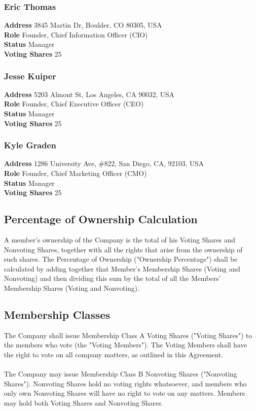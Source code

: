 \documentclass[11pt]{article}
\begin{document}
\subsubsection{Eric Thomas}
\textbf{Address} 3845 Martin Dr, Boulder, CO 80305, USA\\
\textbf{Role} Founder, Chief Information Officer (CIO)\\
\textbf{Status} Manager \\
\textbf{Voting Shares} 25

\subsubsection{Jesse Kuiper}
\textbf{Address} 5203 Almont St, Los Angeles, CA 90032, USA\\
\textbf{Role} Founder, Chief Executive Officer (CEO)\\
\textbf{Status} Manager \\
\textbf{Voting Shares} 25

\subsubsection{Kyle Graden}
\textbf{Address} 1286 University Ave, \#822, San Diego, CA, 92103, USA\\
\textbf{Role} Founder, Chief Marketing Officer (CMO)\\
\textbf{Status} Manager \\
\textbf{Voting Shares} 25

\subsection{Percentage of Ownership Calculation}
A member's ownership of the Company is the total of his Voting Shares and Nonvoting Shares, together with all the rights that arise from the ownership of such shares. The Percentage of Ownership ("Ownership Percentage") shall be calculated by adding together that Member's Membership Shares (Voting and Nonvoting) and then dividing this sum by the total of all the Members' Membership Shares (Voting and Nonvoting).

\subsection{Membership Classes}
\label{sec:membershipClasses}
The Company shall issue Membership Class A Voting Shares ("Voting Shares") to the members who vote (the "Voting Members"). The Voting Members shall have the right to vote on all company matters, as outlined in this Agreement.\\\\
The Company may issue Membership Class B Nonvoting Shares ("Nonvoting Shares"). Nonvoting Shares hold no voting rights whatsoever, and members who only own Nonvoting Shares will have no right to vote on any matters. Members may hold both Voting Shares and Nonvoting Shares.
\end{document}
